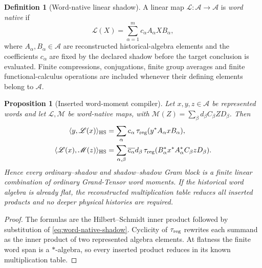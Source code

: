 \documentclass[11pt]{article}
\numberwithin{equation}{section}
\newtheorem{proposition}[theorem]{Proposition}
\theoremstyle{definition}
\newtheorem{definition}[theorem]{Definition}
\theoremstyle{remark}
\newcommand{\HS}{\mathrm{HS}}
\newcommand{\A}{\mathcal A}
\begin{document}
\begin{definition}[Word-native linear shadow]
\label{def:word-native-shadow}
A linear map $\mathscr L:\A\to\A$ is \emph{word native} if
\begin{equation}
 \mathscr L(X)=\sum_{\alpha=1}^m c_\alpha A_\alpha X B_\alpha,
 \label{eq:word-native-shadow}
\end{equation}
where $A_\alpha,B_\alpha\in\A$ are reconstructed historical-algebra elements
and the coefficients $c_\alpha$ are fixed by the declared shadow before the
target conclusion is evaluated.  Finite compressions, conjugations, finite
group averages and finite functional-calculus operations are included whenever
their defining elements belong to $\A$.
\end{definition}

\begin{proposition}[Inserted word-moment compiler]
\label{thm:inserted-word-moments}
Let $x,y,z\in\A$ be represented words and let $\mathscr L,\mathscr M$ be
word-native maps, with
$\mathscr M(Z)=\sum_\beta d_\beta C_\beta ZD_\beta$.  Then
\begin{align}
 \langle y,\mathscr L(x)\rangle_{\HS}
 &=\sum_\alpha c_\alpha\,
   \tau_{\rm reg}(y^*A_\alpha xB_\alpha),
 \label{eq:inserted-one-moment}\\
 \langle\mathscr L(x),\mathscr M(z)\rangle_{\HS}
 &=\sum_{\alpha,\beta}\overline{c_\alpha}d_\beta\,
   \tau_{\rm reg}(B_\alpha^*x^*A_\alpha^*C_\beta zD_\beta).
 \label{eq:inserted-two-moments}
\end{align}
Hence every ordinary--shadow and shadow--shadow Gram block is a finite linear
combination of ordinary Grand-Tensor word moments.  If the historical word
algebra is already flat, the reconstructed multiplication table reduces all
inserted products and no deeper physical histories are required.
\end{proposition}

\begin{proof}
The formulas are the Hilbert--Schmidt inner product followed by substitution of
\eqref{eq:word-native-shadow}.  Cyclicity of $\tau_{\rm reg}$ rewrites each
summand as the inner product of two represented algebra elements.  At flatness
the finite word span is a $*$-algebra, so every inserted product reduces in its
known multiplication table.
\end{proof}
\end{document}
